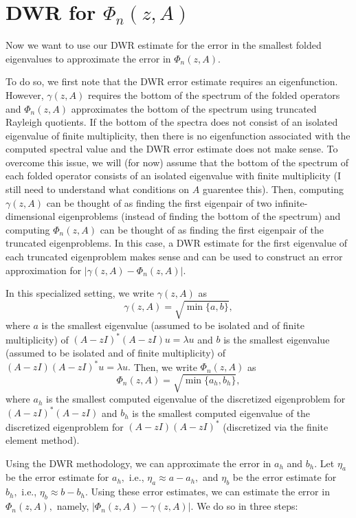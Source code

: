 \documentclass[12pt,a4paper]{article}
\theoremstyle{boldthm}
\theoremstyle{bolddefn}
\begin{document}
\section{DWR for $\Phi_n(z, A)$}

Now we want to use our DWR estimate for the error in the smallest folded eigenvalues to approximate the error in $\Phi_n(z, A).$ 


To do so, we first note that the DWR error estimate requires an eigenfunction. However, $\gamma(z, A)$ requires the bottom of the spectrum of the folded operators and $\Phi_n(z, A)$ approximates the bottom of the spectrum using truncated Rayleigh quotients. If the bottom of the spectra does not consist of an isolated eigenvalue of finite multiplicity, then there is no eigenfunction associated with the computed spectral value and the DWR error estimate does not make sense. To overcome this issue, we will (for now) assume that the bottom of the spectrum of each folded operator consists of an isolated eigenvalue with finite multiplicity (I still need to understand what conditions on $A$ guarentee this). Then, computing $\gamma(z,A)$ can be thought of as finding the first eigenpair of two infinite-dimensional eigenproblems (instead of finding the  bottom of the spectrum) and computing $\Phi_n(z,A)$ can be thought of as finding the first eigenpair of the truncated eigenproblems. In this case, a DWR estimate for the first eigenvalue of each truncated eigenproblem makes sense and can be used to construct an error approximation for $|\gamma(z, A) - \Phi_n(z, A)|.$

In this specialized setting, we write $\gamma(z, A)$ as 
\begin{equation}
    \gamma(z, A) = \sqrt{ \min\{a, b\} },
\end{equation}
where $a$ is the smallest eigenvalue (assumed to be isolated and of finite multiplicity) of $(A-zI)^*(A-zI)u =\lambda u$ and $b$ is the smallest eigenvalue (assumed to be isolated and of finite multiplicity) of $(A-zI)(A-zI)^*u =\lambda u.$ Then, we write $\Phi_n(z, A)$ as 
\begin{equation}
    \Phi_n(z, A) = \sqrt{ \min\{a_h, b_h\} },
\end{equation}
where $a_h$ is the smallest computed eigenvalue of the discretized eigenproblem for $(A-zI)^*(A-zI)$ and $b_h$ is the smallest computed eigenvalue of the discretized eigenproblem for $(A-zI)(A-zI)^*$ (discretized via the finite element method). 

Using the DWR methodology, we can approximate the error in $a_h$ and $b_h.$ Let $\eta_a$ be the error estimate for $a_h,$ i.e., $\eta_a \approx a - a_h,$ and $\eta_b$ be the error estimate for $b_h,$ i.e., $\eta_b \approx b - b_h.$ Using these error estimates, we can estimate the error in $\Phi_n(z, A),$ namely, $|\Phi_n(z, A) - \gamma(z, A)|.$ We do so in three steps:
\end{document}
